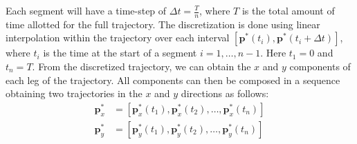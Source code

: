 \documentclass[letterpaper, 10 pt, conference]{ieeeconf}  %
\newcommand\NB[1]{$\spadesuit$\footnote{NB: #1}}
\begin{document}
Each segment will have a time-step of $\Delta t = \frac{T}{n}$, where $T$ is the total amount of time allotted for the full trajectory. The discretization is done using linear interpolation within the trajectory over each interval $[\bm{p}^*(t_i), \bm{p}^*(t_i+\Delta t)]$, where $t_i$ is the time at the start of a segment $i=1, \ldots, n-1$. Here $t_1=0$ and $t_n=T$. 
From the discretized trajectory, we can obtain the $x$ and $y$ components of each leg of the trajectory. All components can then be composed in a sequence obtaining two trajectories in the $x$ and $y$ directions as follows:
\begin{align}
    \bm{p}_x^*&=\left[ \bm{p}_x^*(t_1), \bm{p}_x^*(t_2), \ldots, \bm{p}_x^*(t_{n})\right] \nonumber \\
    \bm{p}_y^*&=\left[ \bm{p}_y^*(t_1), \bm{p}_y^*(t_2), \ldots, \bm{p}_y^*(t_{n})\right]
\end{align}
\end{document}
